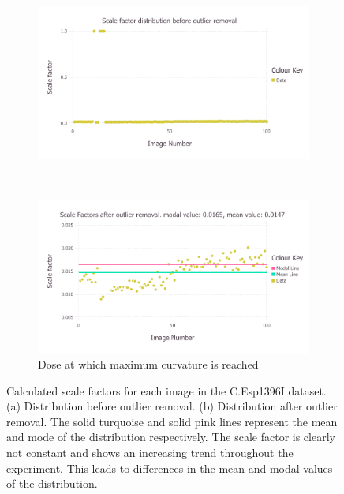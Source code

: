 \begin{figure}
    \centering
    \begin{subfigure}[b]{1.0\textwidth}
            \centering
            \includegraphics[width=\textwidth]{figures/datared/ScaleFac_Plot_Before_outlier_removal_cprot.pdf}
            \caption{}
            \label{fig:Scale factors per image before outlier removal - C.Esp1396I}
    \end{subfigure}
    \\
    \begin{subfigure}[b]{1.0\textwidth}
            \centering
            \includegraphics[width=\textwidth]{figures/datared/ScaleFac_Plot_After_outlier_removal_cprot.pdf}
            \caption{Dose at which maximum curvature is reached}
            \label{fig:Scale factors per image after outlier removal - C.Esp1396I}
    \end{subfigure}
    \caption{Calculated scale factors for each image in the C.Esp1396I dataset.
    (a) Distribution before outlier removal.
    (b) Distribution after outlier removal.
    The solid turquoise and solid pink lines represent the mean and mode of the distribution respectively.
    The scale factor is clearly not constant and shows an increasing trend throughout the experiment.
    This leads to differences in the mean and modal values of the distribution.}
    \label{fig:Scale factors per image - C.Esp1396I}
\end{figure}

